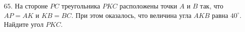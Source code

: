 65. На стороне $PC$ треугольника $PKC$ расположены точки $A$ и $B$ так, что $AP=AK$ и $KB=BC.$ При этом оказалось, что величина угла $AKB$ равна $40^\circ.$ Найдите угол $PKC.$\\
